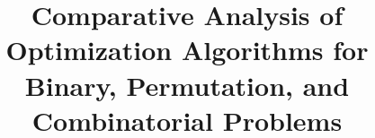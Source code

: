 \documentclass[conference]{IEEEtran}
\begin{document}
\title{Comparative Analysis of Optimization Algorithms for Binary, Permutation, and Combinatorial Problems}
\author{
    \\
}
\maketitle








\end{document}

